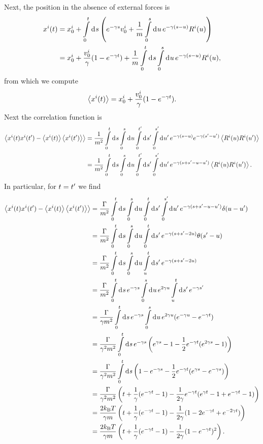 Next, the position in the absence of external forces is
\begin{align*}
	x^{i}(t) &= x^{i}_{0} + \int\limits_{0}^{t}\dd[]{s}\left(e^{-\gamma s}v^{i}_{0} + \frac{1}{m}\int\limits_{0}^{s}\dd[]{u}e^{-\gamma(s - u)}R^{i}(u)\right) \\
	         &= x^{i}_{0} + \frac{v^{i}_{0}}{\gamma}(1 - e^{-\gamma t}) + \frac{1}{m}\int\limits_{0}^{t}\dd[]{s}\int\limits_{0}^{s}\dd[]{u}e^{-\gamma(s - u)}R^{i}(u),
\end{align*}
from which we compute
\begin{align*}
	\expval{x^{i}(t)} = x^{i}_{0} + \frac{v^{i}_{0}}{\gamma}(1 - e^{-\gamma t}).
\end{align*}
Next the correlation function is
\begin{align*}
	\expval{x^{i}(t)x^{i}(t\ensuremath{^{\prime}}) - \expval{x^{i}(t)}\expval{x^{i}(t\ensuremath{^{\prime}})}} &= \frac{1}{m^{2}}\int\limits_{0}^{t}\dd[]{s}\int\limits_{0}^{s}\dd[]{u}\int\limits_{0}^{t^{\prime}}\dd[]{s\ensuremath{^{\prime}}}\int\limits_{0}^{s^{\prime}}\dd[]{u\ensuremath{^{\prime}}}e^{-\gamma(s - u)}e^{-\gamma(s^{\prime} - u^{\prime})}\expval{R^{i}(u)R^{i}(u\ensuremath{^{\prime}})} \\
	&= \frac{1}{m^{2}}\int\limits_{0}^{t}\dd[]{s}\int\limits_{0}^{s}\dd[]{u}\int\limits_{0}^{t^{\prime}}\dd[]{s\ensuremath{^{\prime}}}\int\limits_{0}^{s^{\prime}}\dd[]{u\ensuremath{^{\prime}}}e^{-\gamma(s + s^{\prime} - u - u^{\prime})}\expval{R^{i}(u)R^{i}(u\ensuremath{^{\prime}})}.
\end{align*}
In particular, for $t = t^{\prime}$ we find
\begin{align*}
	\expval{x^{i}(t)x^{i}(t\ensuremath{^{\prime}}) - \expval{x^{i}(t)}\expval{x^{i}(t\ensuremath{^{\prime}})}} &= \frac{\Gamma}{m^{2}}\int\limits_{0}^{t}\dd[]{s}\int\limits_{0}^{s}\dd[]{u}\int\limits_{0}^{t}\dd[]{s\ensuremath{^{\prime}}}\int\limits_{0}^{s^{\prime}}\dd[]{u\ensuremath{^{\prime}}}e^{-\gamma(s + s^{\prime} - u - u^{\prime})}\delta(u - u^{\prime}) \\
	&= \frac{\Gamma}{m^{2}}\int\limits_{0}^{t}\dd[]{s}\int\limits_{0}^{s}\dd[]{u}\int\limits_{0}^{t}\dd[]{s\ensuremath{^{\prime}}}e^{-\gamma(s + s^{\prime} - 2u)}\theta(s^{\prime} - u) \\
	&= \frac{\Gamma}{m^{2}}\int\limits_{0}^{t}\dd[]{s}\int\limits_{0}^{s}\dd[]{u}\int\limits_{u}^{t}\dd[]{s\ensuremath{^{\prime}}}e^{-\gamma(s + s^{\prime} - 2u)} \\
	&= \frac{\Gamma}{m^{2}}\int\limits_{0}^{t}\dd[]{s}e^{-\gamma s}\int\limits_{0}^{s}\dd[]{u}e^{2\gamma u}\int\limits_{u}^{t}\dd[]{s\ensuremath{^{\prime}}}e^{-\gamma s^{\prime}} \\
	&= \frac{\Gamma}{\gamma m^{2}}\int\limits_{0}^{t}\dd[]{s}e^{-\gamma s}\int\limits_{0}^{s}\dd[]{u}e^{2\gamma u}(e^{-\gamma u} - e^{-\gamma t}) \\
	&= \frac{\Gamma}{\gamma^{2}m^{2}}\int\limits_{0}^{t}\dd[]{s}e^{-\gamma s}\left(e^{\gamma s} - 1 - \frac{1}{2}e^{-\gamma t}(e^{2\gamma s} - 1)\right) \\
	&= \frac{\Gamma}{\gamma^{2}m^{2}}\int\limits_{0}^{t}\dd[]{s}\left(1 - e^{-\gamma s} - \frac{1}{2}e^{-\gamma t}(e^{\gamma s} - e^{-\gamma s})\right) \\
	&= \frac{\Gamma}{\gamma^{2}m^{2}}\left(t + \frac{1}{\gamma}(e^{-\gamma t} - 1) - \frac{1}{2\gamma}e^{-\gamma t}(e^{\gamma t} - 1 + e^{-\gamma t} - 1)\right) \\
	&= \frac{2k_{\text{B}} T}{\gamma m}\left(t + \frac{1}{\gamma}(e^{-\gamma t} - 1) - \frac{1}{2\gamma}(1 - 2e^{-\gamma t} + e^{-2\gamma t})\right) \\
	&= \frac{2k_{\text{B}} T}{\gamma m}\left(t + \frac{1}{\gamma}(e^{-\gamma t} - 1) - \frac{1}{2\gamma}(1 - e^{-\gamma t})^{2}\right).
\end{align*}
